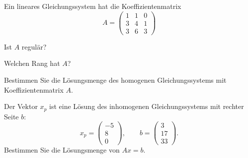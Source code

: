 Ein lineares Gleichungssystem hat die Koeffizientenmatrix
\[
A=\begin{pmatrix}
1&1&0\\
3&4&1\\
3&6&3
\end{pmatrix}
\]
\begin{teilaufgaben}
\item Ist $A$ regulär?
\item Welchen Rang hat $A$?
\item Bestimmen Sie die Lösungsmenge des homogenen Gleichungssystems mit
Koeffizientenmatrix $A$.
\item Der Vektor $x_p$ ist eine Lösung des inhomogenen Gleichungssystems mit
rechter Seite $b$:
\[
x_p=
\begin{pmatrix}
-5\\8\\0
\end{pmatrix}
,\qquad
b=\begin{pmatrix}
3\\17\\33
\end{pmatrix}.
\]
Bestimmen Sie die Lösungsmenge von $Ax=b$.
\end{teilaufgaben}


